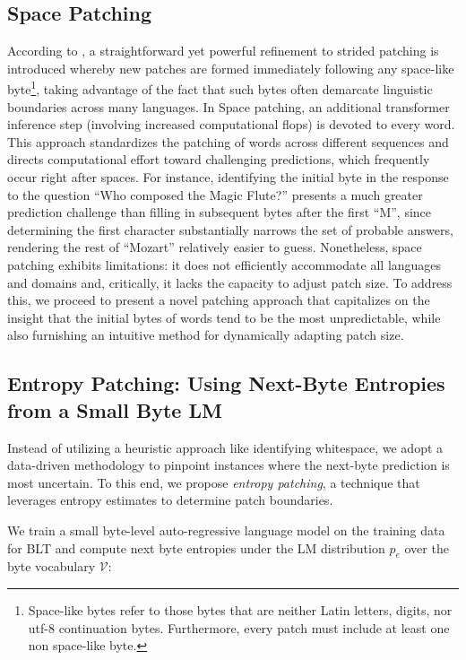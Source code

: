 \subsection{Space Patching}
\label{section:white-patch}

According to \citet{slagle2024spacebyte}, a straightforward yet powerful refinement to strided patching is introduced whereby new patches are formed immediately following any space-like byte\footnote{
    Space-like bytes refer to those bytes that are neither Latin letters, digits, nor utf-8 continuation bytes. Furthermore, every patch must include at least one non space-like byte.}, taking advantage of the fact that such bytes often demarcate linguistic boundaries across many languages. In Space patching, an additional transformer inference step (involving increased computational flops) is devoted to every word. This approach standardizes the patching of words across different sequences and directs computational effort toward challenging predictions, which frequently occur right after spaces. For instance, identifying the initial byte in the response to the question ``Who composed the Magic Flute?\uline{\hspace{.6em}}'' presents a much greater prediction challenge than filling in subsequent bytes after the first ``M'', since determining the first character substantially narrows the set of probable answers, rendering the rest of ``Mozart'' relatively easier to guess. Nonetheless, space patching exhibits limitations: it does not efficiently accommodate all languages and domains and, critically, it lacks the capacity to adjust patch size. To address this, we proceed to present a novel patching approach that capitalizes on the insight that the initial bytes of words tend to be the most unpredictable, while also furnishing an intuitive method for dynamically adapting patch size.

\subsection{Entropy Patching: Using Next-Byte Entropies from a Small Byte LM}
\label{section:dyn-patch}

Instead of utilizing a heuristic approach like identifying whitespace, we adopt a data-driven methodology to pinpoint instances where the next-byte prediction is most uncertain. To this end, we propose \textit{entropy patching}, a technique that leverages entropy estimates to determine patch boundaries.

We train a small byte-level auto-regressive language model on the training data for {\textsc BLT} and compute next byte entropies under the LM distribution $p_{e}$ over the byte vocabulary $\mathcal{V}$:

